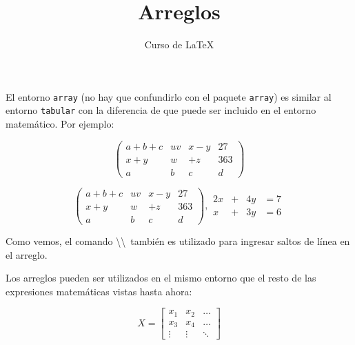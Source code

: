 \documentclass[12pt,letterpaper]{article}
\author{Curso de \LaTeX}
\title{Arreglos}
\begin{document}
\maketitle

El entorno \texttt{array} (no hay que confundirlo con el paquete \texttt{array}) es similar al entorno \texttt{tabular} con la diferencia de que puede ser incluido en el entorno matemático. Por ejemplo:

\[
\left(
\begin{array}{clrr}
      a+b+c & uv & x-y & 27 \\
       x+y  & w  & +z  & 363 \\
       a & b & c & d
\end{array}
\right)
\]

\[
\left(
\begin{array}{clrr}
	a+b+c & uv & x-y & 27 \\
	x+y  & w  & +z  & 363 \\
	a & b & c & d
\end{array}
\right), \begin{array}{rcrl}
	2x & + & 4y & = 7\\
 	  x & + & 3y & = 6
\end{array}
\]

Como vemos, el comando \textbackslash\textbackslash\ también es utilizado para ingresar saltos de línea en el arreglo.

Los arreglos pueden ser utilizados en el mismo entorno que el resto de las expresiones matemáticas vistas hasta ahora:

\begin{equation}
X = \left[
		\begin{array}{ccc}
			x_1 & x_2 & \ldots \\
			x_3 & x_4 & \ldots \\
			\vdots & \vdots & \ddots
		\end{array}
	\right]
\end{equation}
\end{document}
